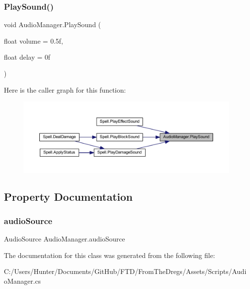 \subsubsection{\texorpdfstring{PlaySound()}{PlaySound()}}
{\footnotesize\ttfamily void Audio\+Manager.\+Play\+Sound (\begin{DoxyParamCaption}\item[{float}]{volume = {\ttfamily 0.5f},  }\item[{float}]{delay = {\ttfamily 0f} }\end{DoxyParamCaption})}

Here is the caller graph for this function\+:
\nopagebreak
\begin{figure}[H]
\begin{center}
\leavevmode
\includegraphics[width=350pt]{class_audio_manager_ac0f0dc189806848c224581b363b87396_icgraph}
\end{center}
\end{figure}


\subsection{Property Documentation}
\mbox{\label{class_audio_manager_a0c2aea6ea779d69228564aca9476ea80}} 
\subsubsection{\texorpdfstring{audioSource}{audioSource}}
{\footnotesize\ttfamily Audio\+Source Audio\+Manager.\+audio\+Source\hspace{0.3cm}{\ttfamily [get]}}



The documentation for this class was generated from the following file\+:\begin{DoxyCompactItemize}
\item 
C\+:/\+Users/\+Hunter/\+Documents/\+Git\+Hub/\+F\+T\+D/\+From\+The\+Dregs/\+Assets/\+Scripts/Audio\+Manager.\+cs\end{DoxyCompactItemize}
